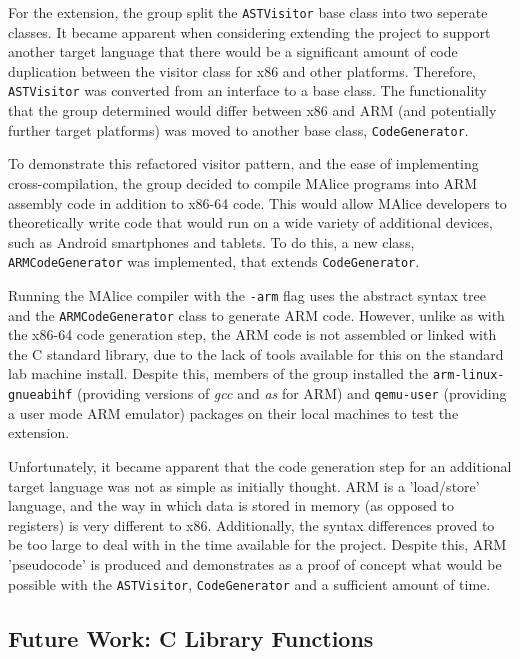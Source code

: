 \documentclass[a4wide, 11pt]{article}
\begin{document}
For the extension, the group split the \texttt{ASTVisitor} base class into two
seperate classes. It became apparent when considering extending the project to
support another target language that there would be a significant amount of 
code duplication between the visitor class for x86 and other platforms. 
Therefore, \texttt{ASTVisitor} was converted from an interface to a base class. 
The functionality that the group determined would differ between x86 and ARM 
(and potentially further target platforms) was moved to another base class, 
\texttt{CodeGenerator}.

\newpage

To demonstrate this refactored visitor pattern, and the ease of implementing
cross-compilation, the group decided to compile MAlice programs into ARM
assembly code in addition to x86-64 code. This would allow MAlice developers
to theoretically write code that would run on a wide variety of additional
devices, such as Android smartphones and tablets. To do this, a new class, 
\texttt{ARMCodeGenerator} was implemented, that extends \texttt{CodeGenerator}.

Running the MAlice compiler with the \texttt{-arm} flag uses the abstract syntax
tree and the \texttt{ARMCodeGenerator} class to generate ARM code. However, unlike 
as with the x86-64 code generation step, the ARM code is not assembled or linked
with the C standard library, due to the lack of tools available for this on the
standard lab machine install. Despite this, members of the group installed the 
\texttt{arm-linux-gnueabihf} (providing versions of \emph{gcc} and \emph{as} for 
ARM) and \texttt{qemu-user} (providing a user mode ARM emulator) packages on 
their local machines to test the extension.

Unfortunately, it became apparent that the code generation step for an 
additional target language was not as simple as initially thought. ARM is a 
'load/store' language, and the way in which data is stored in memory (as opposed
to registers) is very different to x86. Additionally, the syntax differences
proved to be too large to deal with in the time available for the project. 
Despite this, ARM 'pseudocode' is produced and demonstrates as a proof of 
concept what would be possible with the \texttt{ASTVisitor}, 
\texttt{CodeGenerator} and a sufficient amount of time.

\subsection{Future Work: C Library Functions}
\end{document}
